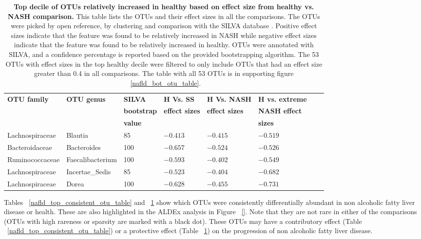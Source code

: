 \begin{table}[!ht]
\begin{tiny}
\begin{tabular}{|l|l|l|l|l|l|l|l|}
\hline
\bf{OTU family} & \bf{OTU genus} & \bf{SILVA} &\bf{H Vs. SS} & \bf{H Vs. NASH} & \bf{H vs. extreme} \\
& & \bf{bootstrap} & \bf{effect sizes} & \bf{effect sizes} & \bf{NASH effect} \\
& & \bf{value} & & & \bf{sizes}\\ \hline
Lachnospiraceae & Blautia & 85 & $-0.413$ & $-0.415$ & $-0.519$ \\ \hline
Bacteroidaceae & Bacteroides & 100 & $-0.657$ & $-0.524$ & $-0.526$ \\ \hline
Ruminococcaceae & Faecalibacterium & 100 & $-0.593$ & $-0.402$ & $-0.549$ \\ \hline
Lachnospiraceae & Incertae_Sedis & 85 & $-0.523$ & $-0.404$ & $-0.682$ \\ \hline
Lachnospiraceae & Dorea & 100 & $-0.628$ & $-0.455$ & $-0.731$ \\ \hline
\end{tabular}
\end{tiny}
\caption[Top decile of OTUs consistently relatively increased in healthy based on effect size from healthy vs. NASH comparison.]{ \textbf{Top decile of OTUs relatively increased in healthy based on effect size from healthy vs. NASH comparison.} This table lists the OTUs and their effect sizes in all the comparisons. The OTUs were picked by open reference, by clustering and comparison with the SILVA database \cite{quast2013silva}. Positive effect sizes indicate that the feature was found to be relatively increased in NASH while negative effect sizes indicate that the feature was found to be relatively increased in healthy. OTUs were annotated with SILVA, and a confidence percentage is reported based on the provided bootstrapping algorithm. The 53 OTUs with effect sizes in the top healthy decile were filtered to only include OTUs that had an effect size greater than 0.4 in all comparisons. The table with all 53 OTUs is in supporting figure ~\ref{nafld_bot_otu_table}.}
\label{nafld_bot_consistent_otu_table}
\end{table}

Tables ~\ref{nafld_top_consistent_otu_table} and ~\ref{nafld_bot_consistent_otu_table} show which OTUs were consistently differentially abundant in non alcoholic fatty liver disease or health. These are also highlighted in the ALDEx analysis in Figure ~\ref{}. Note that they are not rare in either of the comparisons (OTUs with high rareness or sparsity are marked with a black dot). These OTUs may have a contributory effect (Table ~\ref{nafld_top_consistent_otu_table}) or a protective effect (Table ~\ref{nafld_bot_consistent_otu_table}) on the progression of non alcoholic fatty liver disease.

